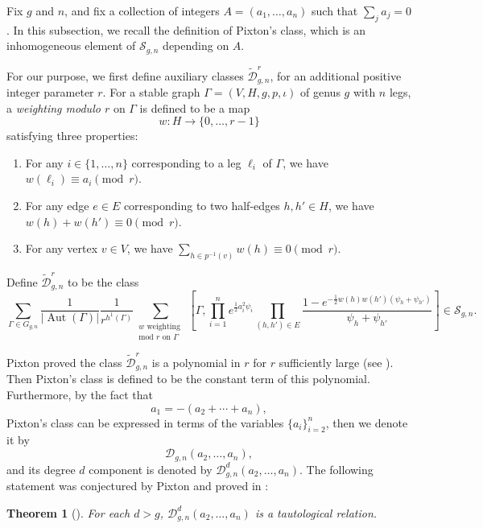 \documentclass[12pt,reqno]{amsart}
\DeclareMathOperator{\Aut}{Aut}
\theoremstyle{plain}
\newtheorem{theorem}{Theorem}
\theoremstyle{definition}
\theoremstyle{remark}
\begin{document}
Fix $g$ and $n$, and fix a collection of integers $A = (a_1, \ldots, a_n)$ such that $\sum_j a_j =0$.  In this subsection, we recall the definition of Pixton's class, which is an inhomogeneous element of $\mathcal{S}_{g,n}$ depending on $A$.

For our purpose,  we  first define auxiliary classes $\widetilde{\mathcal{D}}_{g,n}^r$, for an additional positive integer parameter $r$.  For a stable graph $\Gamma=(V,H,g,p,\iota)$ of genus $g$ with $n$ legs, a \emph{weighting modulo $r$} on $\Gamma$ is defined to be a map
\begin{equation*}
  w\colon H \to \{0, \dotsc, r - 1\}
\end{equation*}
satisfying three properties:
\begin{enumerate}
\item For any $i \in \{1, \dotsc, n\}$ corresponding to a leg $\ell_i$ of $\Gamma$, we have $w(\ell_i) \equiv a_i \pmod{r}$.
\item For any edge $e\in E$ corresponding to two half-edges $h, h'\in H$, we
  have $w(h) + w(h') \equiv 0 \pmod{r}$.
\item For any vertex $v \in V$, we have
  $\sum_{h\in p^{-1}(v)} w(h) \equiv 0 \pmod{r}$.
\end{enumerate}
Define $\widetilde{\mathcal{D}}_{g,n}^r$ to be the class
\begin{equation*}
  \sum_{\Gamma\in G_{g,n}} \frac{1}{|\Aut(\Gamma)|} \frac 1{r^{h^1(\Gamma)}}  \sum_{\substack{w \text{ weighting }\\ \text{mod } r \text{ on }\Gamma}} \left[\Gamma, \prod_{i=1}^n e^{\frac 12 a_i^2\psi_i} \prod_{(h,h')\in E} \frac{1 - e^{-\frac 12 w(h)w(h')(\psi_h + \psi_{h'})}}{\psi_h + \psi_{h'}}\right] \in \mathcal{S}_{g,n}.
\end{equation*}

Pixton proved the class $\widetilde{\mathcal{D}}_{g,n}^r$ is a polynomial in
$r$ for $r$ sufficiently large (see \cite{Pixton2024}).  Then Pixton's class is defined to be  the constant term of this polynomial. Furthermore,  by the fact that
\[a_1 = -(a_2 + \cdots +a_n),\]
Pixton's class can be expressed in terms of the variables $\{a_i\}_{i=2}^{n}$, then we denote it by
\[\mathcal{D}_{g,n}(a_2, \ldots, a_n),\]
and  its degree $d$ component  is denoted by $\mathcal{D}^d_{g,n}(a_2, \ldots, a_n)$.
The following statement was conjectured by Pixton and proved in \cite{clader2018pixton}:
\begin{theorem}[\cite{clader2018pixton}]
\label{thm:DR}
For each $d > g$, $\mathcal{D}^d_{g,n}(a_2, \ldots, a_n)$ is a tautological relation.
\end{theorem}
\end{document}
